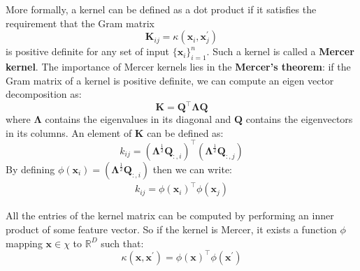 \documentclass[12pt]{report}
\begin{document}
            More formally, a kernel can be defined as a dot product if it satisfies the requirement that the Gram matrix
            \begin{equation}
                \boldsymbol{K}_{ij} = \kappa(\boldsymbol{x}_i, \boldsymbol{x}^{'}_j)
            \end{equation}
            is positive definite for any set of input $\{\boldsymbol{x}_i\}_{i=1}^{n}$. Such a kernel is called a \textbf{Mercer kernel}. The importance of Mercer kernels lies in the \textbf{Mercer's theorem}: if the Gram matrix of a kernel is positive definite, we can compute an eigen vector decomposition as:
            \begin{equation}
                \boldsymbol{K} = \boldsymbol{Q}^\top \boldsymbol{\Lambda} \boldsymbol{Q}
            \end{equation}
            where $\boldsymbol{\Lambda}$ contains the eigenvalues in its diagonal and $\boldsymbol{Q}$ contains the eigenvectors in its columns. An element of $\boldsymbol{K}$ can be defined as:
            \begin{equation}
                k_{ij} = (\boldsymbol{\Lambda}^{\frac{1}{2}}\boldsymbol{Q}_{:,i})^\top (\boldsymbol{\Lambda}^{\frac{1}{2}}\boldsymbol{Q}_{:,j})
            \end{equation}
            By defining $\phi(\boldsymbol{x}_i) = (\boldsymbol{\Lambda}^{\frac{1}{2}}\boldsymbol{Q}_{:,i})$ then we can write:
            \begin{align}
                k_{ij} = \phi(\boldsymbol{x}_i)^\top \phi(\boldsymbol{x}_j)
            \end{align}
            
            All the entries of the kernel matrix can be computed by performing an inner product of some feature vector. So if the kernel is Mercer, it exists a function $\phi$ mapping $\boldsymbol{x} \in \chi$ to $\mathbb{R}^D$ such that:
            \begin{equation}
                \kappa(\boldsymbol{x}, \boldsymbol{x}^{'}) = \phi(\boldsymbol{x})^\top \phi(\boldsymbol{x}^{'})
            \end{equation}
            
\end{document}

